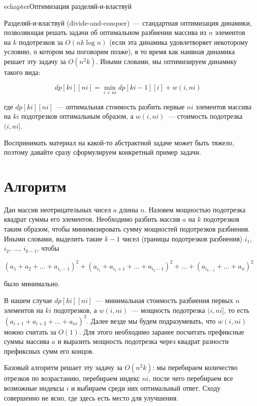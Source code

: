 echapter{Оптимизация разделяй-и-властвуй} \label{divide-and-conquer-optimization}

Разделяй-и-властвуй (divide-and-conquer)~--- стандартная оптимизация динамики, позволяющая решать задачи об оптимальном разбиении массива из $n$ элементов на $k$ подотрезков за $O(n k \log n)$ (если эта динамика удовлетворяет некоторому условию, о котором мы поговорим позже), в то время как наивная динамика решает эту задачу за $O(n^2 k)$. Иными словами, мы оптимизируем динамику такого вида:

$$dp[ki][ni] = \min_{i < ni} dp[ki - 1][i] + w(i, ni)$$

где $dp[ki][ni]$~--- оптимальная стоимость разбить первые $ni$ элементов массива на $ki$ подотрезков оптимальным образом, а $w(i, ni)$~--- стоимость подотрезка $(i, ni]$.

Воспринимать материал на какой-то абстрактной задаче может быть тяжело, поэтому давайте сразу сформулируем конкретный пример задачи.

\section{Алгоритм}

\begin{problem}
    Дан массив неотрицательных чисел $a$ длины $n$. Назовем мощностью подотрезка квадрат суммы его элементов. Необходимо разбить массив $a$ на $k$ подотрезков таким образом, чтобы минимизировать сумму мощностей подотрезков разбиения. Иными словами, выделить такие $k - 1$ чисел (границы подотрезков разбиения) $i_1$, $i_2$, $\ldots$, $i_{k - 1}$, чтобы

    $$(a_1 + a_2 + \ldots + a_{i_1 - 1})^2 + (a_{i_1} + a_{i_1 + 1} + \ldots + a_{i_2 - 1})^2 + \ldots + (a_{i_{k - 1}} + \ldots + a_{n})^2$$

было минимально.
\end{problem}

В нашем случае $dp[ki][ni]$~--- минимальная стоимость разбиения первых $n$ элементов на $ki$ подотрезков, а $w(i, ni)$~--- мощность подотрезка $(i, ni]$, то есть $(a_{i + 1} + a_{i + 2} + \ldots + a_{ni})^2$. Далее везде мы будем подразумевать, что $w(i, ni)$ можно считать за $O(1)$. Для этого необходимо заранее посчитать префиксные суммы массива $a$ и выразить мощность подотрезка через квадрат разности префиксных сумм его концов.

Базовый алгоритм решает эту задачу за $O(n^2 k)$: мы перебираем количество отрезков по возрастанию, перебираем индекс $ni$, после чего перебираем все возможные индексы $i$ и выбираем среди них оптимальный ответ. Сходу совершенно не ясно, где здесь есть место для улучшения.

